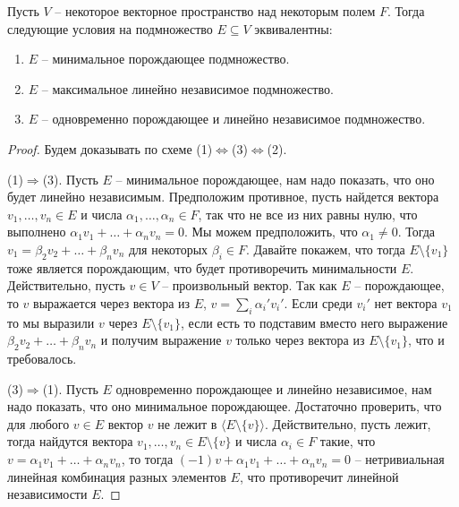 \begin{claim}
\label{claim::Basis}
Пусть $V$ -- некоторое векторное пространство над некоторым полем $F$.
Тогда следующие условия на подмножество $E\subseteq V$ эквивалентны:
\begin{enumerate}
\item $E$ -- минимальное порождающее подмножество.

\item $E$ -- максимальное линейно независимое подмножество.

\item $E$ -- одновременно порождающее и линейно независимое подмножество.
\end{enumerate}
\end{claim}
\begin{proof}
Будем доказывать по схеме (1)$\Leftrightarrow$(3)$\Leftrightarrow$(2).

(1)$\Rightarrow$(3).
Пусть $E$ -- минимальное порождающее, нам надо показать, что оно будет линейно независимым.
Предположим противное, пусть найдется вектора $v_1,\ldots,v_n\in E$ и числа $\alpha_1,\ldots,\alpha_n\in F$, так что не все из них равны нулю, что выполнено $\alpha_1 v_1 +\ldots + \alpha_n v_n = 0$.
Мы можем предположить, что $\alpha_1 \neq 0$.
Тогда $v_1 = \beta_2 v_2 +\ldots + \beta_n v_n$ для некоторых $\beta_i\in F$.
Давайте покажем, что тогда $E\setminus\{v_1\}$ тоже является порождающим, что будет противоречить минимальности $E$.
Действительно, пусть $v\in V$ -- произвольный вектор.
Так как $E$ -- порождающее, то $v$ выражается через вектора из $E$, $v = \sum_i \alpha_i' v_i'$.
Если среди $v_i'$ нет вектора $v_1$ то мы выразили $v$ через $E\setminus\{v_1\}$, если есть то подставим вместо него выражение $\beta_2 v_2 + \ldots + \beta_n v_n$ и получим выражение $v$ только через вектора из $E\setminus \{v_1\}$, что и требовалось.

(3)$\Rightarrow$(1).
Пусть $E$ одновременно порождающее и линейно независимое, нам надо показать, что оно минимальное порождающее.
Достаточно проверить, что для любого $v\in E$ вектор $v$ не лежит в $\langle E\setminus\{v\}\rangle$.
Действительно, пусть лежит, тогда найдутся вектора $v_1,\ldots, v_n\in E\setminus\{v\}$ и числа $\alpha_i\in F$ такие, что $v = \alpha_1 v_1 + \ldots + \alpha_n v_n$, то тогда $(-1)v + \alpha_1 v_1 + \ldots + \alpha_n v_n = 0$ -- нетривиальная линейная комбинация разных элементов $E$, что противоречит линейной независимости $E$.


\end{proof}
